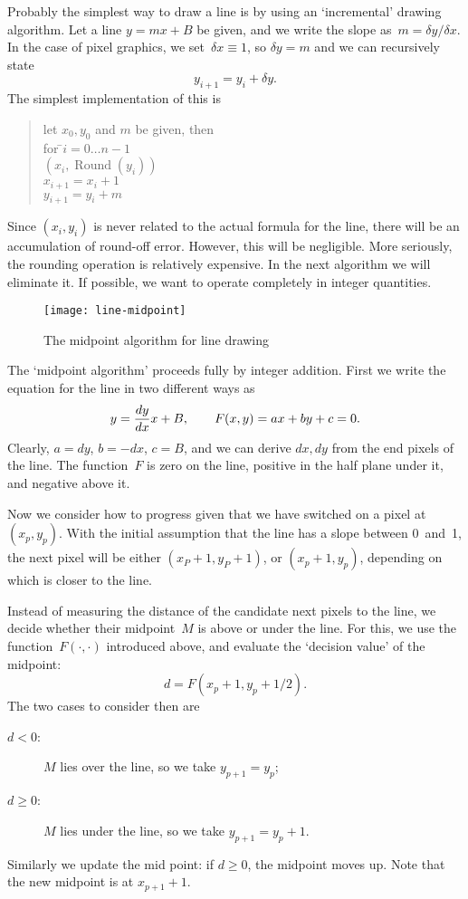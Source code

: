 Probably the simplest way to draw a line is by using an
`incremental' drawing algorithm. Let a line
$y=mx+B$ be given, and we write the slope as~$m=\delta y/\delta x$. In
the case of pixel graphics, we set~$\delta x\equiv1$, so $\delta y=m$
and we can
recursively state \[y_{i+1}=y_i+\delta y.\]
The simplest implementation of this is
\begin{quote}
\begin{tabbing}
let $x_0,y_0$ and $m$ be given, then\\
for \=$i=0\ldots n-1$\\
\>$(x_i,\mathop{\textrm{Round}}(y_i))$\\
\>$x_{i+1}=x_i+1$\\
\>$y_{i+1}=y_i+m$
\end{tabbing}
\end{quote}
Since  $(x_i,y_i)$ is never related to the actual formula for the line,
there will be an accumulation of round-off error. However, this will
be negligible. More seriously, the rounding operation is relatively
expensive. In the next algorithm we will eliminate it. If possible, we
want to operate completely in integer quantities.

\begin{figure}
\texttt{[image: line-midpoint]}
\caption{The midpoint algorithm for line drawing}
\end{figure}

The `midpoint algorithm' proceeds fully by integer addition. First we
write the equation for the line in two different ways as
\[ y={dy\over dx}x+B, \qquad F(x,y)=ax+by+c=0.\]
Clearly, $a=dy$, $b=-dx$, $c=B$, and we can derive $dx,dy$ from the
end pixels of the line. The function~$F$ is zero on the line, positive
in the half plane under it, and negative above it.

Now we consider how to progress given that we have switched on a pixel
at~$(x_p,y_p)$. With the initial assumption that the line has a slope
between 0~and~1, the next pixel will be either $(x_P+1,y_P+1)$, or
$(x_p+1,y_p)$, depending on which is closer to the line. 

Instead of measuring the distance of the candidate next pixels to the
line, we decide whether their midpoint~$M$ is above or under the line. For
this, we use the function~$F(\cdot,\cdot)$ introduced above, and
evaluate the `decision value' of the midpoint:
\[ d=F(x_p+1,y_p+1/2). \]
The two cases to consider then are
\begin{description}
\item[$d<0$:] $M$ lies over the line, so we take $y_{p+1}=y_p$;
\item[$d\geq0$:] $M$ lies under the line, so we take $y_{p+1}=y_p+1$.
\end{description}
Similarly we update the mid point: if $d\geq0$, the midpoint moves up.
Note that the new midpoint is at $x_{p+1}+1$.

